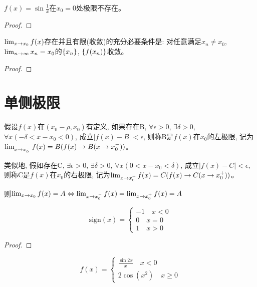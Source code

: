 \begin{proposition}
    $f(x) = \sin \frac{1}{x}$在$x_0 = 0$处极限不存在。
\end{proposition}
\begin{proof}
    
\end{proof}

\begin{lemma}
    $\lim_{x \to x_0 } f(x)$存在并且有限(收敛)的充分必要条件是: 对任意满足$x_n \neq x_0$, $\lim_{n \to \infty } x_n = x_0$的$\left\{ x_n\right\}$, $\left\{ f(x_n)\right\}$收敛。
\end{lemma}
\begin{proof}
    
\end{proof}

\section{单侧极限}
\begin{definition}
    假设$f(x)$在$(x_0 - \rho, x_0)$有定义, 如果存在B, $\forall \epsilon > 0$, $\exists \delta > 0$, $\forall x(-\delta < x-x_0 < 0)$, 成立$\left| f(x) - B\right| < \epsilon$, 则称B是$f(x)$在$x_0$的左极限, 记为$\lim_{x \to x_0^- } f(x) = B(f(x)\to B(x \to x_0^-))$。

    类似地, 假如存在C, $\exists \epsilon > 0$, $\exists \delta > 0$, $\forall x(0 < x - x_0 < \delta )$, 成立$\left| f(x) - C \right| < \epsilon$, 则称C是$f(x)$在$x_0$的右极限, 记为$\lim_{x \to x_0^+ } f(x) = C(f(x)\to C(x \to x_0^+))$。

    则$\lim_{x \to x_0 } f(x) = A \Leftrightarrow \lim_{x \to x_0^- } f(x) = \lim_{x \to x_0^+ } f(x) = A$
\end{definition}

\begin{proposition}
    \begin{equation*}
        \mathrm{sign} (x) = \left\{ 
            \begin{aligned}
                -1 \quad x < 0 \\
                0 \quad x = 0 \\
                1 \quad x > 0 
            \end{aligned}
        \right.
    \end{equation*}
\end{proposition}
\begin{proof}
    
\end{proof}
\begin{proposition}
    \begin{equation*}
        f(x) = \left\{
            \begin{aligned}
               \frac{\sin 2x}{x} \quad x < 0 \\
               2\cos(x^2) \quad x \ge 0 
            \end{aligned}
        \right.
    \end{equation*}
\end{proposition}


